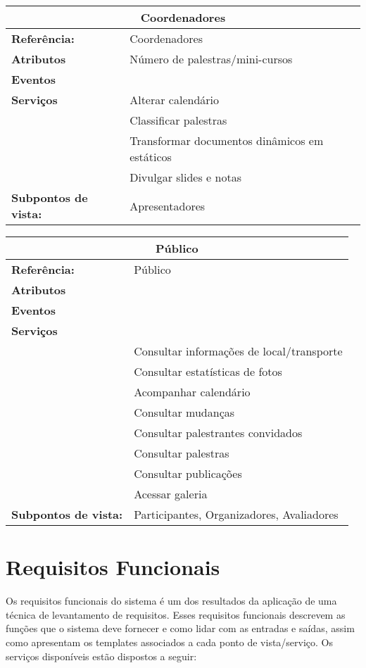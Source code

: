 \documentclass[letter]{article}
\begin{document}
\begin{center}
%
\begin{table}[h!]
\begin{center}
\begin{tabular}{|ll|}
\hline 
\multicolumn{2}{|c|}{\textbf{Coordenadores}}\tabularnewline
\hline
\textbf{Referência:} & Coordenadores\tabularnewline
\textbf{Atributos} & Número de palestras/mini-cursos\tabularnewline
\textbf{Eventos} & \tabularnewline
\textbf{Serviços} & Alterar calendário\tabularnewline
 & Classificar palestras\tabularnewline
 & Transformar documentos dinâmicos em estáticos\tabularnewline
 & Divulgar slides e notas\tabularnewline
\textbf{Subpontos de vista:} & Apresentadores \tabularnewline
\hline
\end{tabular}
\end{center}
\end{table}


%
\begin{table}[h!]
\begin{center}
\begin{tabular}{|ll|}
\hline 
\multicolumn{2}{|c|}{\textbf{Público}}\tabularnewline
\hline
\textbf{Referência:} &  Público\tabularnewline
\textbf{Atributos} & \tabularnewline
\textbf{Eventos} & \tabularnewline
\textbf{Serviços} & \tabularnewline
 & Consultar informações de local/transporte\tabularnewline
 & Consultar estatísticas de fotos\tabularnewline
 & Acompanhar calendário \tabularnewline
 & Consultar mudanças\tabularnewline
 & Consultar palestrantes convidados\tabularnewline
 & Consultar palestras\tabularnewline
 & Consultar publicações\tabularnewline
 & Acessar galeria\tabularnewline
\textbf{Subpontos de vista:} & Participantes, Organizadores, Avaliadores \tabularnewline
\hline

\end{tabular}

\end{center}

\end{table}

\end{center}


\newpage
\section{Requisitos Funcionais}

Os requisitos funcionais do sistema é um dos resultados da aplicação de uma técnica de levantamento de requisitos. Esses requisitos funcionais descrevem as funções que o sistema deve fornecer e como lidar com as entradas e saídas, assim como apresentam os templates associados a cada ponto de vista/serviço. Os serviços disponíveis estão dispostos a seguir:
\end{document}
